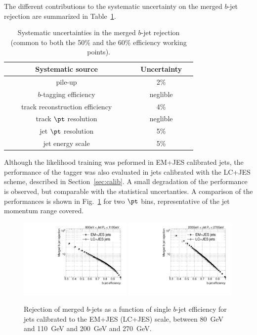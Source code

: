 \vspace{3mm}
The different contributions to the systematic uncertainty on the merged $b$-jet rejection are summarized in Table~\ref{tb:systematics}.
\begin{table}[!hbt] %
\renewcommand{\arraystretch}{1.2}
\centering
\begin{tabular}{ | c | c |}
\hline
  ~~~~~~~Systematic source~~~~~~~ &~~Uncertainty~~\\ \hline
  pile-up          &  2\%     \\ 
  $b$-tagging efficiency     &  neglible     \\ 
  track reconstruction efficiency  &    4\%        \\ 
  track $\pt$ resolution &  neglible     \\
  jet $\pt$ resolution  &    5\%        \\  
  jet energy scale  &    5\%        \\ \hline 
\end{tabular}
\caption{Systematic uncertainties in the merged $b$-jet rejection (common to both the 50\% and the 60\% efficiency working points).}
\label{tb:systematics}
\end{table}


Although the likelihood training was peformed in EM+JES calibrated jets, the performance of the tagger was also evaluated in jets calibrated with the LC+JES scheme, described in Section~\ref{sec:calib}.  A small degradation of the performance is observed, but comparable with the statistical uncertanties. A comparison of the performances is shown in Fig.~\ref{fig:LCJES} for two $\pt$ bins, representative of the jet momentum range covered. 

\begin{figure}[tp]
\centering
\includegraphics[width=0.49\textwidth]{FIGS/systematics/LlhoodKDE_ISO_LCcalibTest_rejvseff080.pdf}
\includegraphics[width=0.49\textwidth]{FIGS/systematics/LlhoodKDE_ISO_LCcalibTest_rejvseff200.pdf}
\caption{Rejection of merged $b$-jets as a function of single $b$-jet efficiency for jets calibrated to the EM+JES (LC+JES) scale, between 80~GeV and 110~GeV and 200~GeV and 270~GeV.}
\label{fig:LCJES}
\end{figure}

